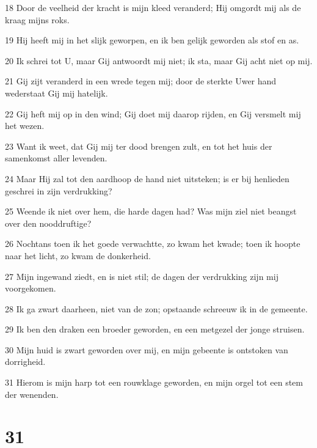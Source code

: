\par 18 Door de veelheid der kracht is mijn kleed veranderd; Hij omgordt mij als de kraag mijns roks.
\par 19 Hij heeft mij in het slijk geworpen, en ik ben gelijk geworden als stof en as.
\par 20 Ik schrei tot U, maar Gij antwoordt mij niet; ik sta, maar Gij acht niet op mij.
\par 21 Gij zijt veranderd in een wrede tegen mij; door de sterkte Uwer hand wederstaat Gij mij hatelijk.
\par 22 Gij heft mij op in den wind; Gij doet mij daarop rijden, en Gij versmelt mij het wezen.
\par 23 Want ik weet, dat Gij mij ter dood brengen zult, en tot het huis der samenkomst aller levenden.
\par 24 Maar Hij zal tot den aardhoop de hand niet uitsteken; is er bij henlieden geschrei in zijn verdrukking?
\par 25 Weende ik niet over hem, die harde dagen had? Was mijn ziel niet beangst over den nooddruftige?
\par 26 Nochtans toen ik het goede verwachtte, zo kwam het kwade; toen ik hoopte naar het licht, zo kwam de donkerheid.
\par 27 Mijn ingewand ziedt, en is niet stil; de dagen der verdrukking zijn mij voorgekomen.
\par 28 Ik ga zwart daarheen, niet van de zon; opstaande schreeuw ik in de gemeente.
\par 29 Ik ben den draken een broeder geworden, en een metgezel der jonge struisen.
\par 30 Mijn huid is zwart geworden over mij, en mijn gebeente is ontstoken van dorrigheid.
\par 31 Hierom is mijn harp tot een rouwklage geworden, en mijn orgel tot een stem der wenenden.

\chapter{31}

